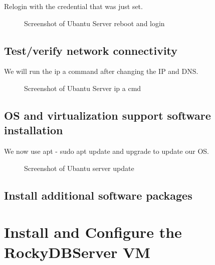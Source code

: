 \documentclass{article}
\begin{document}
	Relogin with the credential that was just set.

		\FloatBarrier
		\begin{figure}[h!]
			\centering
			\caption{Screenshot of Ubantu Server reboot and login}
		\end{figure}
		\FloatBarrier


	\FloatBarrier
	\subsection{Test/verify network connectivity}
	\label{subsec:Test/verify network connectivityID}

	We will run the ip a command after changing the IP and DNS.

		\FloatBarrier
		\begin{figure}[h!]
			\centering
			\caption{Screenshot of Ubantu Server ip a cmd}
		\end{figure}
		\FloatBarrier


	\FloatBarrier
	\subsection{OS and virtualization support software installation}
	\label{subsec:OS and virtualization support software installationID}

	We now use apt - sudo apt update and upgrade to update our OS.

		\FloatBarrier
		\begin{figure}[h!]
			\centering
			\caption{Screenshot of Ubantu server update}
		\end{figure}
		\FloatBarrier


	\FloatBarrier
	\subsection{Install additional software packages}
	\label{subsec:Install additional software packagesID}

	

\section{Install and Configure the RockyDBServer VM}
\label{sec:Install and Configure the RockyDBServer VMID}

	\FloatBarrier
\end{document}
